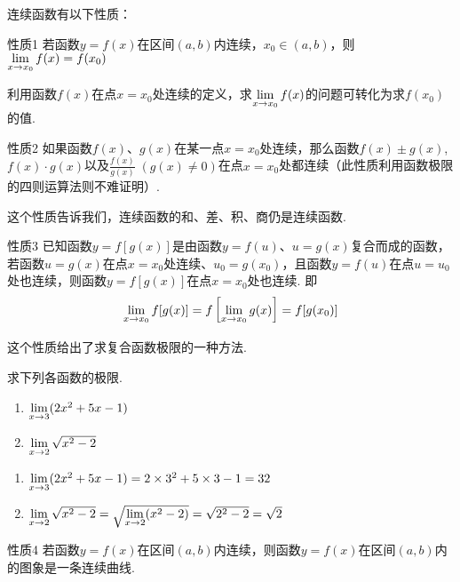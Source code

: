 连续函数有以下性质：

\begin{thm}{性质1}
    若函数$y=f(x)$在区间$(a,b)$内连续，$x_0\in (a,b)$，则$\lim\limits_{x\to x_0}f(x)=f(x_0)$
\end{thm}

利用函数$f(x)$在点$x=x_0$处连续的定义，求$\lim\limits_{x\to x_0}f(x)$的问题可转化为求$f(x_0)$的值.

\begin{thm}{性质2}
    如果函数$f(x)$、$g(x)$在某一点$x=x_0$处连续，那么函数$f(x)\pm g(x)$, $f(x)\cdot g(x)$以及$\frac{f(x)}{g(x)}\; (g(x)\ne 0)$在点$x=x_0$处都连续（此性质利用函数极限的四则运算法则不难证明）.
\end{thm}

这个性质告诉我们，连续函数的和、差、积、商仍是连续函数.

\begin{thm}{性质3}
    已知函数$y=f[g(x)]$是由函数$y=f(u)$、$u=g(x)$复合而成的函数，若函数$u=g(x)$在点$x=x_0$处连续、$u_0=g(x_0)$，且函数$y=f(u)$在点$u=u_0$处也连续，则函数$y=f[g(x)]$在点$x=x_0$处也连续. 即
\[\lim\limits_{x\to x_0} f[g(x)]=f\left[\lim\limits_{x\to x_0} g(x)\right]=f[g(x_0)]  \]
\end{thm}

这个性质给出了求复合函数极限的一种方法.

\begin{example}
    求下列各函数的极限.
\begin{multicols}{2}
\begin{enumerate}[(1)]
    \item $\lim\limits_{x\to 3}(2x^2+5x-1)$
    \item $\lim\limits_{x\to 2}\sqrt{x^2-2}$
\end{enumerate}
\end{multicols}
\end{example}

\begin{solution}
\begin{enumerate}[(1)]
    \item $\lim\limits_{x\to 3}(2x^2+5x-1)=2\times 3^2+5\times 3-1=32$
    \item $\lim\limits_{x\to 2}\sqrt{x^2-2}=\sqrt{\lim\limits_{x\to 2}(x^2-2)}=\sqrt{2^2-2}=\sqrt{2}$
\end{enumerate}
\end{solution}    

\begin{thm}{性质4}
    若函数$y=f(x)$在区间$(a,b)$内连续，则函数$y=f(x)$在区间$(a,b)$内的图象是一条连续曲线.
\end{thm}


